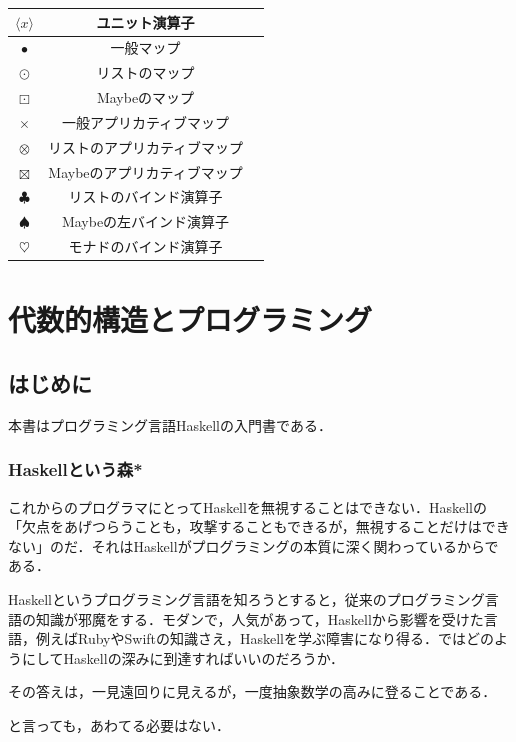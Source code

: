 \documentclass[a4paper]{jsbook}
\newcommand{\programminglanguage}[1]{\textsf{#1}}
\newcommand{\haskell}{\programminglanguage{Haskell}}
\newcommand{\ruby}{\programminglanguage{Ruby}}
\newcommand{\swift}{\programminglanguage{Swift}}
\newenvironment{leader}{\begingroup}{\endgroup}
\newcommand{\mUnitWith}[1]{\langle#1\rangle}
\DeclareMathOperator{\mMap}{\bullet}
\DeclareMathOperator{\mMapList}{\odot}
\DeclareMathOperator{\mMapMaybe}{\boxdot}
\DeclareMathOperator{\mAMap}{\times}
\DeclareMathOperator{\mAMapList}{\otimes}
\DeclareMathOperator{\mAMapMaybe}{\boxtimes}
\DeclareMathOperator{\mBindList}{\clubsuit}%
\DeclareMathOperator{\mBindMaybe}{\spadesuit}%
\DeclareMathOperator{\mBind}{\heartsuit}%
\begin{document}
\begin{table}[p]
\begin{center}
\begin{tabular}{||c|c|c||}
$\mUnitWith{x}$&ユニット演算子&\\
\hline
$\mMap$&一般マップ&\\
$\mMapList$&リストのマップ&\\
$\mMapMaybe$&Maybeのマップ&\\
\hline
$\mAMap$&一般アプリカティブマップ&\\
$\mAMapList$&リストのアプリカティブマップ&\\
$\mAMapMaybe$&Maybeのアプリカティブマップ&\\
\hline
$\mBindList$&リストのバインド演算子&\\
$\mBindMaybe$&Maybeの左バインド演算子&\\
$\mBind$&モナドのバインド演算子&\\
\hline
\end{tabular}
\end{center}
\end{table}

\part{代数的構造とプログラミング}

\chapter{はじめに}

\begin{leader}
本書はプログラミング言語\haskell の入門書である．
\end{leader}

\section{\haskell という森*}

これからのプログラマにとって\haskell を無視することはできない．\haskell の「欠点をあげつらうことも，攻撃することもできるが，無視することだけはできない」のだ．それは\haskell がプログラミングの本質に深く関わっているからである．

\haskell というプログラミング言語を知ろうとすると，従来のプログラミング言語の知識が邪魔をする．モダンで，人気があって，\haskell から影響を受けた言語，例えば\ruby や\swift の知識さえ，\haskell を学ぶ障害になり得る．ではどのようにして\haskell の深みに到達すればいいのだろうか．

その答えは，一見遠回りに見えるが，一度抽象数学の高みに登ることである．

と言っても，あわてる必要はない．
\end{document}
